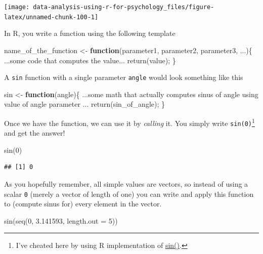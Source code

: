 \documentclass[
]{book}
\newenvironment{Shaded}{\begin{snugshade}}{\end{snugshade}}
\newcommand{\AttributeTok}[1]{\textcolor[rgb]{0.77,0.63,0.00}{#1}}
\newcommand{\ControlFlowTok}[1]{\textcolor[rgb]{0.13,0.29,0.53}{\textbf{#1}}}
\newcommand{\DecValTok}[1]{\textcolor[rgb]{0.00,0.00,0.81}{#1}}
\newcommand{\FloatTok}[1]{\textcolor[rgb]{0.00,0.00,0.81}{#1}}
\newcommand{\FunctionTok}[1]{\textcolor[rgb]{0.00,0.00,0.00}{#1}}
\newcommand{\NormalTok}[1]{#1}
\newcommand{\OtherTok}[1]{\textcolor[rgb]{0.56,0.35,0.01}{#1}}
\begin{document}
\begin{center}\texttt{[image: data-analysis-using-r-for-psychology\_files/figure-latex/unnamed-chunk-100-1]} \end{center}

In R, you write a function using the following template

\begin{Shaded}
\begin{Highlighting}[]
\NormalTok{name\_of\_the\_function }\OtherTok{\textless{}{-}} \ControlFlowTok{function}\NormalTok{(parameter1, parameter2, parameter3, ...)\{}
\NormalTok{  ...some code that computes the value...}
  \FunctionTok{return}\NormalTok{(value);}
\NormalTok{\}}
\end{Highlighting}
\end{Shaded}

A \texttt{sin} function with a single parameter \texttt{angle} would look something like this

\begin{Shaded}
\begin{Highlighting}[]
\NormalTok{sin }\OtherTok{\textless{}{-}} \ControlFlowTok{function}\NormalTok{(angle)\{}
\NormalTok{  ...some math that actually computes sinus of angle using value of angle parameter ...}
  \FunctionTok{return}\NormalTok{(sin\_of\_angle);}
\NormalTok{\}}
\end{Highlighting}
\end{Shaded}

Once we have the function, we can use it by \emph{calling} it. You simply write \texttt{sin(0)}\footnote{I've cheated here by using R implementation of \href{https://stat.ethz.ch/R-manual/R-devel/library/base/html/Trig.html}{sin()}.} and get the answer!

\begin{Shaded}
\begin{Highlighting}[]
\FunctionTok{sin}\NormalTok{(}\DecValTok{0}\NormalTok{)}
\end{Highlighting}
\end{Shaded}

\begin{verbatim}
## [1] 0
\end{verbatim}

As you hopefully remember, all simple values are vectors, so instead of using a scalar \texttt{0} (merely a vector of length of one) you can write and apply this function to (compute sinus for) every element in the vector.

\begin{Shaded}
\begin{Highlighting}[]
\FunctionTok{sin}\NormalTok{(}\FunctionTok{seq}\NormalTok{(}\DecValTok{0}\NormalTok{, }\FloatTok{3.141593}\NormalTok{, }\AttributeTok{length.out =} \DecValTok{5}\NormalTok{))}
\end{Highlighting}
\end{Shaded}
\end{document}
